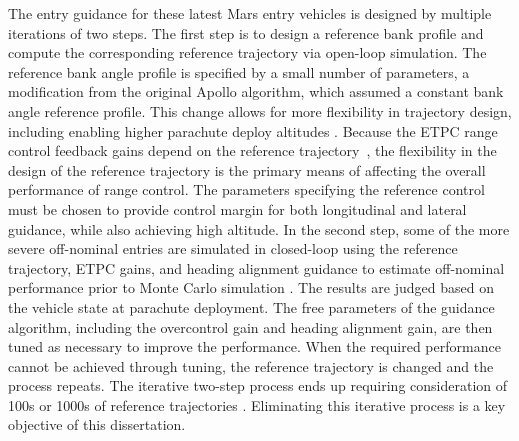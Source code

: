 
The entry guidance for these latest Mars entry vehicles \cite{MSL_EDL2,M2020_EDL} is designed by multiple iterations of two steps. The first step is to design a reference bank profile and compute the corresponding reference trajectory via open-loop simulation. The reference bank angle profile is specified by a small number of parameters, a modification from the original Apollo algorithm, which assumed a constant bank angle reference profile. This change allows for more flexibility in trajectory design, including enabling higher parachute deploy altitudes \cite{MSL_EDL2}. Because the ETPC range control feedback gains depend on the reference trajectory~\cite{Apollo}, the flexibility in the design of the reference trajectory is the primary means of affecting the overall performance of range control. The parameters specifying the reference control must be chosen to provide control margin for both longitudinal and lateral guidance, while also achieving high altitude.
In the second step, some of the more severe off-nominal entries are simulated in closed-loop using the reference trajectory, ETPC gains, and heading alignment guidance to estimate off-nominal performance prior to Monte Carlo simulation \cite{MSL_EDL2}. The results are judged based on the vehicle state at parachute deployment. The free parameters of the guidance algorithm, including the overcontrol gain and heading alignment gain, are then tuned as necessary to improve the performance. When the required performance cannot be achieved through tuning, the reference trajectory is changed and the process repeats. The iterative two-step process ends up requiring consideration of 100s or 1000s of reference trajectories \cite{MSL_EDL2}. Eliminating this iterative process is a key objective of this dissertation.

